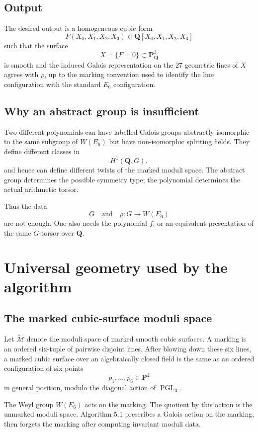\documentclass[11pt]{article}
\newcommand{\QQ}{\mathbf{Q}}
\newcommand{\PP}{\mathbf{P}}
\newcommand{\PGL}{\operatorname{PGL}}
\newcommand{\tcM}{\widetilde{\mathcal{M}}}
\newcommand{\W}{W(E_6)}
\begin{document}
\subsection{Output}

The desired output is a homogeneous cubic form
\[
  F(X_0,X_1,X_2,X_3)\in\QQ[X_0,X_1,X_2,X_3]
\]
such that the surface
\[
  X=\{F=0\}\subset\PP^3_\QQ
\]
is smooth and the induced Galois representation on the $27$ geometric lines of
$X$ agrees with $\rho$, up to the marking convention used to identify the line
configuration with the standard $E_6$ configuration.

\subsection{Why an abstract group is insufficient}

Two different polynomials can have labelled Galois groups abstractly isomorphic to
the same subgroup of $\W$ but have non-isomorphic splitting fields.  They define
different classes in
\[
  H^1(\QQ,G),
\]
and hence can define different twists of the marked moduli space.  The abstract
group determines the possible symmetry type; the polynomial determines the actual
arithmetic torsor.

Thus the data
\[
  G\quad\text{and}\quad \rho:G\to\W
\]
are not enough.  One also needs the polynomial $f$, or an equivalent presentation
of the same $G$-torsor over $\QQ$.

\section{Universal geometry used by the algorithm}

\subsection{The marked cubic-surface moduli space}

Let $\tcM$ denote the moduli space of marked smooth cubic surfaces.  A marking is
an ordered six-tuple of pairwise disjoint lines.  After blowing down these six
lines, a marked cubic surface over an algebraically closed field is the same as an
ordered configuration of six points
\[
  p_1,\ldots,p_6\in\PP^2
\]
in general position, modulo the diagonal action of $\PGL_3$.

The Weyl group $\W$ acts on the marking.  The quotient by this action is the
unmarked moduli space.  Algorithm 5.1 prescribes a Galois action on the marking,
then forgets the marking after computing invariant moduli data.
\end{document}
